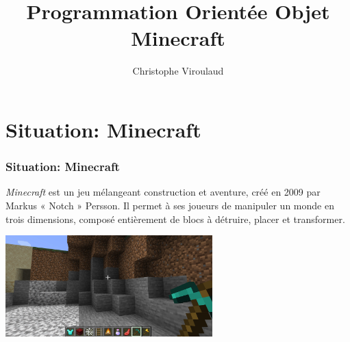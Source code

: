 \documentclass[svgnames,11pt]{beamer}
\author[]{Christophe Viroulaud}
\title{Programmation Orientée Objet\\Minecraft}
\date{}
\institute{Terminale - NSI}
\begin{document}
\begin{frame}
    \titlepage
\end{frame}
\section{Situation: Minecraft}
\begin{frame}
    \frametitle{Situation: Minecraft}

    \emph{Minecraft} est un jeu mélangeant construction et aventure, créé en 2009 par Markus « Notch » Persson. Il permet à ses joueurs de manipuler un monde en trois dimensions, composé entièrement de blocs à détruire, placer et transformer.
    \begin{center}
        \centering
        \includegraphics[width=8cm]{ressources/minecraft.jpg}
    \end{center}


\end{frame}
\begin{frame}
    \frametitle{}

    \begin{center}
    \end{center}

\end{frame}
\end{document}
